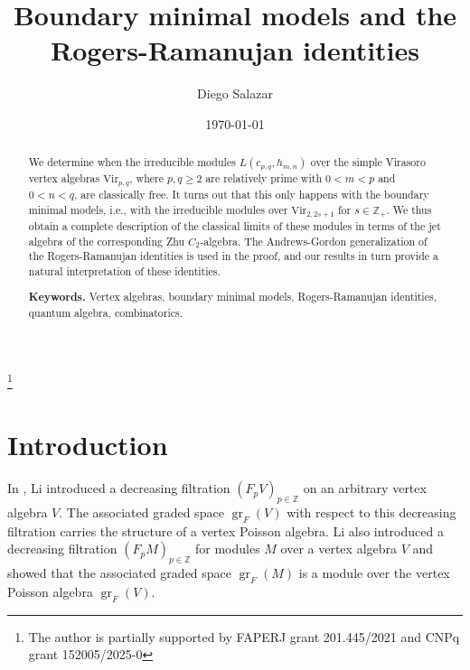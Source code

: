\documentclass[a4paper, 12pt, reqno]{amsart}
\theoremstyle{remark}
\DeclareMathOperator{\gr}{gr}
\newcommand{\Vir}{{\mathrm{Vir}}}
\begin{document}
\setcounter{section}{-1}

\title{Boundary minimal models and the Rogers-Ramanujan identities}
\author{Diego Salazar}
\thanks{The author is partially supported by FAPERJ grant 201.445/2021 and CNPq grant 152005/2025-0}
\address{Universidade Federal do Rio de Janeiro, Macaé, RJ, Brazil}
\date{\today}

\begin{abstract}
  We determine when the irreducible modules $L(c_{p, q}, h_{m, n})$ over the simple Virasoro vertex algebras $\Vir_{p, q}$, where $p, q \ge 2$ are relatively prime with $0 < m < p$ and $0 < n < q$, are classically free.
  It turns out that this only happens with the boundary minimal models, i.e., with the irreducible modules over $\Vir_{2, 2s + 1}$ for $s \in \mathbb{Z}_+$.
  We thus obtain a complete description of the classical limits of these modules in terms of the jet algebra of the corresponding Zhu $C_2$-algebra.
  The Andrews-Gordon generalization of the Rogers-Ramanujan identities is used in the proof, and our results in turn provide a natural interpretation of these identities.

  \noindent \textbf{Keywords.} Vertex algebras, boundary minimal models, Rogers-Ramanujan identities, quantum algebra, combinatorics.
\end{abstract}

\maketitle


\section{Introduction}
\label{sec:introduction}

In \cite{li_abelianizing_2005}, Li introduced a decreasing filtration $(F_pV)_{p \in \mathbb{Z}}$ on an arbitrary vertex algebra $V$.
The associated graded space $\gr_F(V)$ with respect to this decreasing filtration carries the structure of a vertex Poisson algebra.
Li also introduced a decreasing filtration $(F_pM)_{p \in \mathbb{Z}}$ for modules $M$ over a vertex algebra $V$ and showed that the associated graded space $\gr_F(M)$ is a module over the vertex Poisson algebra $\gr_F(V)$.
\end{document}
